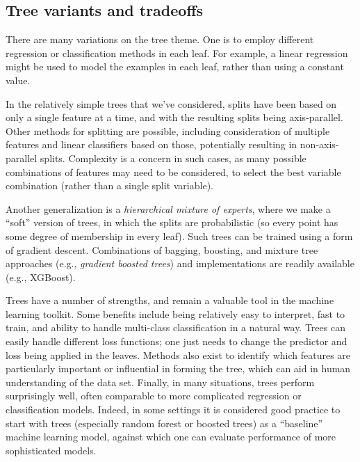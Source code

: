 \subsection{Tree variants and tradeoffs}

There are many variations on the tree theme. One is to employ
different regression or classification methods in each leaf.  For
example, a linear regression might be used to model the examples in
each leaf, rather than using a constant value.

In the relatively simple trees that we've considered, splits
have been based on only a single feature at a time, and with the
resulting splits being axis-parallel. Other methods for splitting are
possible, including consideration of multiple features and linear
classifiers based on those, potentially resulting in non-axis-parallel
splits. Complexity is a concern in such cases, as many possible
combinations of features may need to be considered, to select the
best variable combination (rather than a single split variable).

Another generalization is a {\em hierarchical mixture of experts},
where we make a ``soft'' version of trees, in which the splits are
probabilistic (so every point has some degree of membership in every
leaf). Such trees can be trained using a form of gradient
descent. Combinations of bagging, boosting, and mixture tree
approaches (e.g., {\em gradient boosted trees}) and
implementations are readily available (e.g., XGBoost).

Trees have a number of strengths, and remain a valuable tool
in the machine learning toolkit.  Some benefits include being
relatively easy to interpret, fast to train, and ability to handle
multi-class classification in a natural way. Trees can easily
handle different loss functions; one just needs to change the
predictor and loss being applied in the leaves. Methods also exist to
identify which features are particularly important or influential in
forming the tree, which can aid in human understanding of the data
set.  Finally, in many situations, trees perform surprisingly
well, often comparable to more complicated regression or
classification models. Indeed, in some settings it is considered good
practice to start with trees (especially random forest or
boosted trees) as a ``baseline'' machine learning model,
against which one can evaluate performance of more sophisticated
models.









